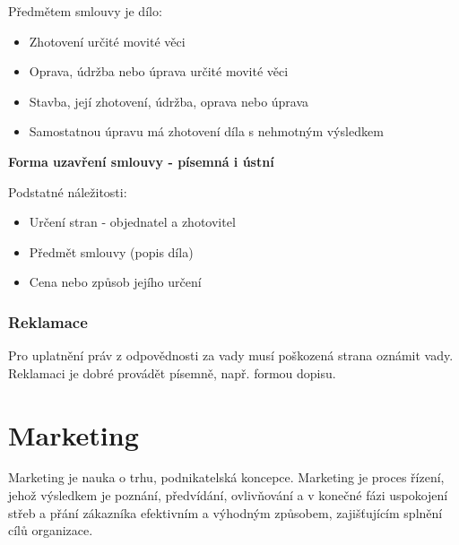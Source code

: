 \documentclass[11pt,a4paper,twoside]{book}
\begin{document}
	Předmětem smlouvy je dílo:
	\begin{itemize}
		\item Zhotovení určité movité věci
		\item Oprava, údržba nebo úprava určité movité věci
		\item Stavba, její zhotovení, údržba, oprava nebo úprava
		\item Samostatnou úpravu má zhotovení díla s nehmotným výsledkem
	\end{itemize}

	\textbf{Forma uzavření smlouvy - písemná i ústní}

	Podstatné náležitosti:
	\begin{itemize}
		\item Určení stran - objednatel a zhotovitel
		\item Předmět smlouvy (popis díla)
		\item Cena nebo způsob jejího určení	
	\end{itemize}

	\subsection*{Reklamace}
	Pro uplatnění práv z odpovědnosti za vady musí poškozená strana oznámit vady.
	Reklamaci je dobré provádět písemně, např. formou dopisu.


	\chapter{Marketing}

	Marketing je nauka o trhu, podnikatelská koncepce. Marketing je proces řízení, jehož výsledkem je poznání, předvídání, ovlivňování a v konečné fázi uspokojení střeb a přání zákazníka efektivním a výhodným způsobem, zajišťujícím splnění cílů organizace.
\end{document}
